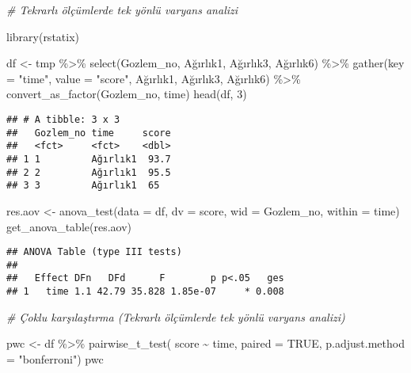 \documentclass[
]{article}
\newenvironment{Shaded}{\begin{snugshade}}{\end{snugshade}}
\newcommand{\AttributeTok}[1]{\textcolor[rgb]{0.77,0.63,0.00}{#1}}
\newcommand{\CommentTok}[1]{\textcolor[rgb]{0.56,0.35,0.01}{\textit{#1}}}
\newcommand{\ConstantTok}[1]{\textcolor[rgb]{0.00,0.00,0.00}{#1}}
\newcommand{\DecValTok}[1]{\textcolor[rgb]{0.00,0.00,0.81}{#1}}
\newcommand{\FunctionTok}[1]{\textcolor[rgb]{0.00,0.00,0.00}{#1}}
\newcommand{\NormalTok}[1]{#1}
\newcommand{\OtherTok}[1]{\textcolor[rgb]{0.56,0.35,0.01}{#1}}
\newcommand{\SpecialCharTok}[1]{\textcolor[rgb]{0.00,0.00,0.00}{#1}}
\newcommand{\StringTok}[1]{\textcolor[rgb]{0.31,0.60,0.02}{#1}}
\begin{document}
\begin{Shaded}
\begin{Highlighting}[]
\CommentTok{\# Tekrarlı ölçümlerde tek yönlü varyans analizi}

\FunctionTok{library}\NormalTok{(rstatix)}

\NormalTok{df }\OtherTok{\textless{}{-}}\NormalTok{ tmp }\SpecialCharTok{\%\textgreater{}\%}
  \FunctionTok{select}\NormalTok{(Gozlem\_no, Ağırlık1, Ağırlık3, Ağırlık6) }\SpecialCharTok{\%\textgreater{}\%}
  \FunctionTok{gather}\NormalTok{(}\AttributeTok{key =} \StringTok{"time"}\NormalTok{, }\AttributeTok{value =} \StringTok{"score"}\NormalTok{, Ağırlık1, Ağırlık3, Ağırlık6) }\SpecialCharTok{\%\textgreater{}\%}
  \FunctionTok{convert\_as\_factor}\NormalTok{(Gozlem\_no, time)}
\FunctionTok{head}\NormalTok{(df, }\DecValTok{3}\NormalTok{)}
\end{Highlighting}
\end{Shaded}

\begin{verbatim}
## # A tibble: 3 x 3
##   Gozlem_no time     score
##   <fct>     <fct>    <dbl>
## 1 1         Ağırlık1  93.7
## 2 2         Ağırlık1  95.5
## 3 3         Ağırlık1  65
\end{verbatim}

\begin{Shaded}
\begin{Highlighting}[]
\NormalTok{res.aov }\OtherTok{\textless{}{-}} \FunctionTok{anova\_test}\NormalTok{(}\AttributeTok{data =}\NormalTok{ df, }\AttributeTok{dv =}\NormalTok{ score, }\AttributeTok{wid =}\NormalTok{ Gozlem\_no, }\AttributeTok{within =}\NormalTok{ time)}
\FunctionTok{get\_anova\_table}\NormalTok{(res.aov)}
\end{Highlighting}
\end{Shaded}

\begin{verbatim}
## ANOVA Table (type III tests)
## 
##   Effect DFn   DFd      F        p p<.05   ges
## 1   time 1.1 42.79 35.828 1.85e-07     * 0.008
\end{verbatim}

\begin{Shaded}
\begin{Highlighting}[]
\CommentTok{\# Çoklu karşılaştırma (Tekrarlı ölçümlerde tek yönlü varyans analizi)}

\NormalTok{pwc }\OtherTok{\textless{}{-}}\NormalTok{ df }\SpecialCharTok{\%\textgreater{}\%}
  \FunctionTok{pairwise\_t\_test}\NormalTok{(}
\NormalTok{    score }\SpecialCharTok{\textasciitilde{}}\NormalTok{ time, }\AttributeTok{paired =} \ConstantTok{TRUE}\NormalTok{,}
    \AttributeTok{p.adjust.method =} \StringTok{"bonferroni"}\NormalTok{)}
\NormalTok{pwc}
\end{Highlighting}
\end{Shaded}
\end{document}
